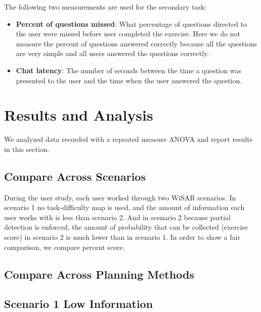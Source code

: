 \documentclass[journal]{IEEEtran}
\begin{document}
The following two measurements are used for the secondary task:
\begin{itemize}
\item \textbf{Percent of questions missed}: What percentage of questions directed to the user were missed before user completed the exercise. Here we do not measure the percent of questions answered correctly because all the questions are very simple and all users answered the questions correctly.
\item \textbf{Chat latency}: The number of seconds between the time a question was presented to the user and the time when the user answered the question.
\end{itemize}

\section{Results and Analysis} 
\label{sec:Results}

We analyzed data recorded with a repeated measure ANOVA and report results in this section.

\subsection{Compare Across Scenarios}

During the user study, each user worked through two WiSAR scenarios. In scenario 1 no task-difficulty map is used, and the amount of information each user works with is less than scenario 2. And in scenario 2 because partial detection is enforced, the amount of probability that can be collected (exercise score) in scenario 2 is much lower than in scenario 1. In order to show a fair comparison, we compare percent score.






\subsection{Compare Across Planning Methods}


\subsection{Scenario 1 Low Information}
\end{document}
